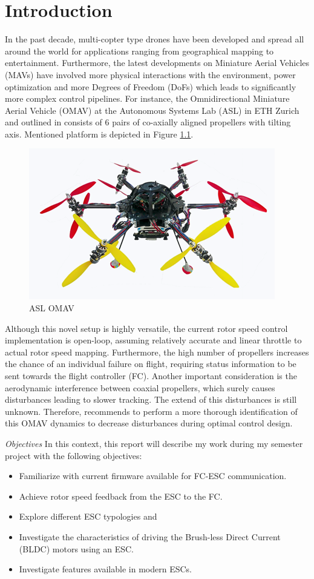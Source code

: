 \chapter{Introduction}
\label{sec:introduction}
In the past decade, multi-copter type drones have been developed and spread all around the world for applications ranging from geographical mapping to entertainment. Furthermore, the latest developments on Miniature Aerial Vehicles (MAVs) have involved more physical interactions with the environment, power optimization and more Degrees of Freedom (DoFs) which leads to significantly more complex control pipelines. For instance, the Omnidirectional Miniature Aerial Vehicle (OMAV) at the Autonomous Systems Lab (ASL) in ETH Zurich and outlined in \cite{Bodie_Proceeding_2020} consists of 6 pairs of co-axially aligned propellers with tilting axis. Mentioned platform is depicted in Figure \ref{fig: mav_photo}.
\begin{figure}
    \centering
    \includegraphics{images/mav_photo.png}
    \caption{ASL OMAV}
    \label{fig: mav_photo}
\end{figure}

Although this novel setup is highly versatile, the current rotor speed control implementation is open-loop, assuming relatively accurate and linear throttle to actual rotor speed mapping. Furthermore, the high number of propellers increases the chance of an individual failure on flight, requiring status information to be sent towards the flight controller (FC). Another important consideration is the aerodynamic interference between coaxial propellers, which surely causes disturbances leading to slower tracking. The extend of this disturbances is still unknown. Therefore, \cite{Bodie_pre_release_2020} recommends to perform a more thorough identification of this OMAV dynamics to decrease disturbances during optimal control design.

\textit{Objectives} In this context, this report will describe my work during my semester project with the following objectives:
\begin{itemize}
    \item Familiarize with current firmware available for FC-ESC communication.
    \item Achieve rotor speed feedback from the ESC to the FC.
    \item Explore different ESC typologies and 
    \item Investigate the characteristics of driving the Brush-less Direct Current (BLDC) motors using an ESC.
    \item Investigate features available in modern ESCs.
\end{itemize}